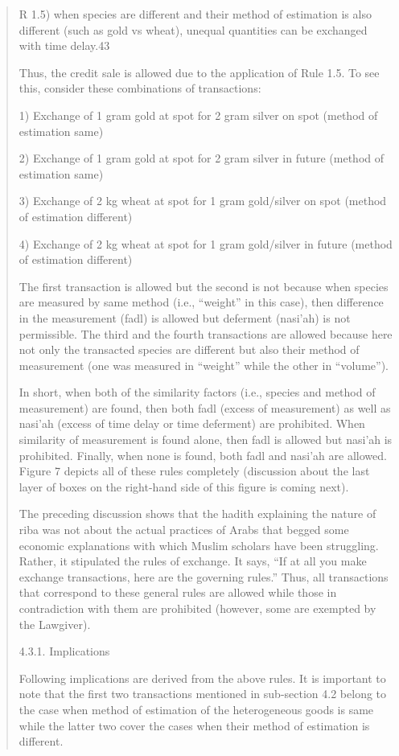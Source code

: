 \begin{quote}
R 1.5) when species are different and their method of estimation is also different (such as gold vs wheat), unequal quantities can be exchanged with time delay.43

Thus, the credit sale is allowed due to the application of Rule 1.5. To see this, consider these combinations of transactions:

1) Exchange of 1 gram gold at spot for 2 gram silver on spot (method of estimation same)

2) Exchange of 1 gram gold at spot for 2 gram silver in future (method of estimation same)

3) Exchange of 2 kg wheat at spot for 1 gram gold/silver on spot (method of estimation different)

4) Exchange of 2 kg wheat at spot for 1 gram gold/silver in future (method of estimation different)

The first transaction is allowed but the second is not because when species are measured by same method (i.e., “weight” in this case), then difference in the measurement (fadl) is allowed but deferment (nasi'ah) is not permissible. The third and the fourth transactions are allowed because here not only the transacted species are different but also their method of measurement (one was measured in “weight” while the other in “volume”).

In short, when both of the similarity factors (i.e., species and method of measurement) are found, then both fadl (excess of measurement) as well as nasi'ah (excess of time delay or time deferment) are prohibited. When similarity of measurement is found alone, then fadl is allowed but nasi'ah is prohibited. Finally, when none is found, both fadl and nasi'ah are allowed. Figure 7 depicts all of these rules completely (discussion about the last layer of boxes on the right-hand side of this figure is coming next).

The preceding discussion shows that the hadith explaining the nature of riba was not about the actual practices of Arabs that begged some economic explanations with which Muslim scholars have been struggling. Rather, it stipulated the rules of exchange. It says, “If at all you make exchange transactions, here are the governing rules.” Thus, all transactions that correspond to these general rules are allowed while those in contradiction with them are prohibited (however, some are exempted by the Lawgiver).

4.3.1. Implications

Following implications are derived from the above rules. It is important to note that the first two transactions mentioned in sub-section 4.2 belong to the case when method of estimation of the heterogeneous goods is same while the latter two cover the cases when their method of estimation is different.


\end{quote}

